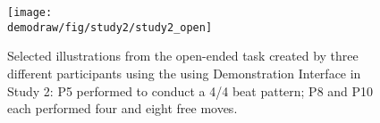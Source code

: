 \begin{appendices}
\begin{figure}[h!]
     \centering
    \texttt{[image: \\demodraw/fig/study2/study2\_open]}
    \caption{Selected illustrations from the open-ended task created by three different participants using the using Demonstration Interface in Study 2: P5 performed to conduct a 4/4 beat pattern; P8 and P10 each performed four and eight free moves.}
    \label{fig:open_ended_examples}
 \end{figure}

\end{appendices}
